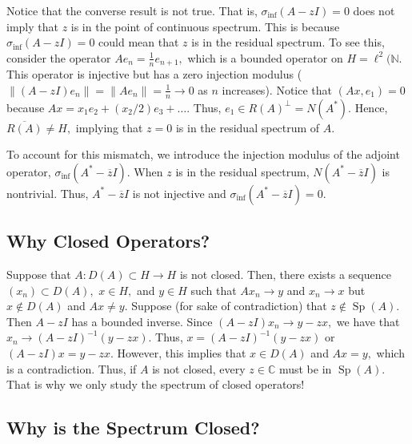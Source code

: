 \documentclass[12pt,a4paper]{article}
\newcommand{\Sp}[1]{\operatorname{Sp}\!\left(#1\right)}
\theoremstyle{boldthm}
\theoremstyle{bolddefn}
\begin{document}
Notice that the converse result is not true. That is, $\sigma_{\inf}(A-zI) = 0$ does not imply that $z$ is in the point of continuous spectrum. This is because $\sigma_{\inf}(A-zI)=0$ could mean that $z$ is in the residual spectrum. To see this, consider the operator $Ae_n = \frac{1}{n} e_{n+1},$ which is a bounded operator on $H = \ell^2(\mathbb{N}.$ This operator is injective but has a zero injection modulus ($\|(A-zI)e_n\| = \|Ae_n\| = \frac{1}{n} \rightarrow 0$ as $n$ increases). Notice that $(Ax, e_1) = 0$ because $Ax = x_1 e_2 + (x_2/2) e_3 + \dots.$ Thus, $e_1 \in R(A)^\perp = N(A^*).$ Hence, $\overline{R(A)} \ne H,$ implying that $z=0$ is in the residual spectrum of $A.$

To account for this mismatch, we introduce the injection modulus of the adjoint operator, $\sigma_{\inf}(A^* - \overline zI).$ When $z$ is in the residual spectrum, $N(A^* - \overline z I)$ is nontrivial. Thus, $A^* - \overline z I$ is not injective and  $\sigma_{\inf}(A^* - \overline zI) = 0.$


\subsection{Why Closed Operators?}

Suppose that $A : D(A) \subset H \rightarrow H$ is not closed. Then, there exists a sequence $(x_n) \subset D(A),$ $x \in H,$ and $y \in H$ such that $Ax_n \rightarrow y$ and $x_n \rightarrow x$ but $x \notin D(A)$ and $Ax \ne y.$ Suppose (for sake of contradiction) that $z \notin \Sp{A}.$ Then $A-zI$ has a bounded inverse. Since $(A-zI)x_n \rightarrow y - zx,$ we have that $x_n \rightarrow (A-zI)^{-1}(y-zx).$ Thus, $x = (A-zI)^{-1}(y-zx)$ or $(A-zI) x = y - zx.$ However, this implies that $x \in D(A)$ and $Ax=y,$ which is a contradiction. Thus, if $A$ is not closed, every $z \in \mathbb{C}$ must be in $\Sp{A}.$ That is why we only study the spectrum of closed operators!

\subsection{Why is the Spectrum Closed?}
\end{document}
